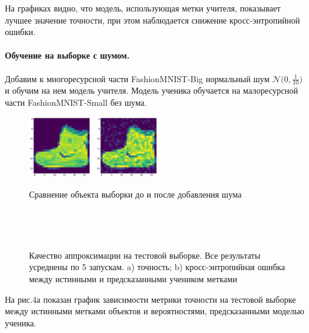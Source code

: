 На графиках видно, что модель, использующая метки учителя, показывает лучшее значение точности, при этом наблюдается снижение кросс-энтропийной ошибки.

\newpage
\paragraph{Обучение на выборке с шумом.}
Добавим к многоресурсной части FashionMNIST-Big нормальный шум $\mathcal{N}\bigr(0,\frac{1}{10}\bigr)$ и обучим на нем модель учителя. Модель ученика обучается на малоресурсной части FashionMNIST-Small без шума.

\begin{figure}[h!t]\center
{\includegraphics[width=0.5\textwidth]{results/noise}}
\caption{Сравнение объекта выборки до и после добавления шума}
\end{figure}\\

\begin{figure}[h!t]\center
{}
\\
\caption{Качество аппроксимации на тестовой выборке. Все результаты усреднены по 5 запускам. a) точность; b) кросс-энтропийная ошибка между истинными и предсказанными учеником метками}
\end{figure}

На рис.4а показан график зависимости метрики точности на тестовой выборке между истинными метками объектов и вероятностями, предсказанными моделью ученика.


